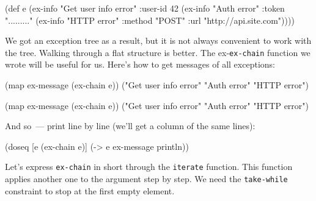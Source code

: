 \else

\begin{english}
  \begin{clojure}
(def e
  (ex-info
   "Get user info error"
   {:user-id 42}
   (ex-info "Auth error"
            {:token "........."}
            (ex-info "HTTP error"
                     {:method "POST"
                      :url "http://api.site.com"}))))
  \end{clojure}
\end{english}

\fi


We got an exception tree as a result, but it is not always convenient to work with the tree. Walking through a flat structure is better. The ex-\verb|ex-chain| function we wrote will be useful for us. Here's how to get messages of all exceptions:

\ifx\DEVICETYPE\MOBILE

\begin{english}
  \begin{clojure}
(map ex-message (ex-chain e))
("Get user info error"
 "Auth error" "HTTP error")
  \end{clojure}
\end{english}

\else

\begin{english}
  \begin{clojure}
(map ex-message (ex-chain e))
("Get user info error" "Auth error" "HTTP error")
  \end{clojure}
\end{english}

\fi

\noindent
And so~--- print line by line (we'll get a column of the same lines): 


\begin{english}
  \begin{clojure}
(doseq [e (ex-chain e)]
  (-> e ex-message println))
  \end{clojure}
\end{english}

Let's express \verb|ex-chain| in short through the \verb|iterate| function. This function applies another one to the argument step by step. We need the \verb|take-while| constraint to stop at the first empty element.

\ifx\DEVICETYPE\MOBILE

